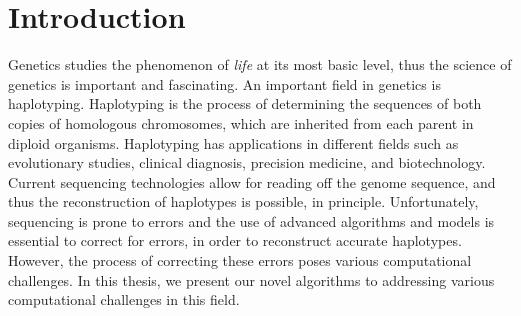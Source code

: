 \chapter{Introduction}



Genetics studies the phenomenon of \textit{life} at its most basic level, thus the science of genetics is important and fascinating.
An important field in genetics is haplotyping.
Haplotyping is the process of determining the sequences of both copies of homologous chromosomes, which are inherited from each parent in diploid organisms.
Haplotyping has applications in different fields such as evolutionary studies, clinical diagnosis, precision medicine, and biotechnology. 
Current sequencing technologies allow for reading off the genome sequence, and thus the reconstruction of haplotypes is
possible, in principle. Unfortunately, sequencing is prone to errors and the use of advanced algorithms and models is essential to correct for errors, in order to reconstruct accurate haplotypes.
However, the process of correcting these errors poses various computational challenges.
In this thesis, we present our novel algorithms to addressing various computational challenges in this field.

